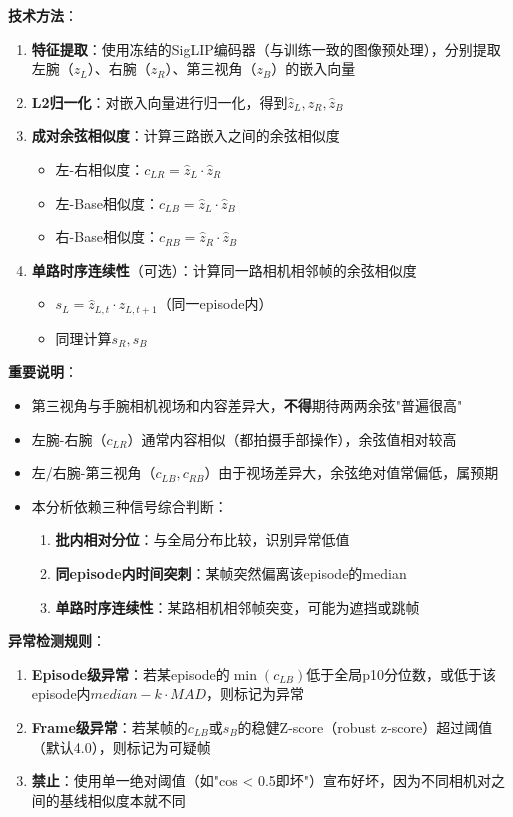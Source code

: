 \textbf{技术方法}：
\begin{enumerate}[leftmargin=2em]
    \item \textbf{特征提取}：使用冻结的SigLIP编码器（与训练一致的图像预处理），分别提取左腕（$z_L$）、右腕（$z_R$）、第三视角（$z_B$）的嵌入向量
    \item \textbf{L2归一化}：对嵌入向量进行归一化，得到$\hat{z}_L, \hat{z}_R, \hat{z}_B$
    \item \textbf{成对余弦相似度}：计算三路嵌入之间的余弦相似度
    \begin{itemize}
        \item 左-右相似度：$c_{LR} = \hat{z}_L \cdot \hat{z}_R$
        \item 左-Base相似度：$c_{LB} = \hat{z}_L \cdot \hat{z}_B$
        \item 右-Base相似度：$c_{RB} = \hat{z}_R \cdot \hat{z}_B$
    \end{itemize}
    \item \textbf{单路时序连续性}（可选）：计算同一路相机相邻帧的余弦相似度
    \begin{itemize}
        \item $s_L = \hat{z}_{L,t} \cdot \hat{z}_{L,t+1}$（同一episode内）
        \item 同理计算$s_R, s_B$
    \end{itemize}
\end{enumerate}

\textbf{重要说明}：
\begin{itemize}[leftmargin=2em]
    \item 第三视角与手腕相机视场和内容差异大，\textbf{不得}期待两两余弦"普遍很高"
    \item 左腕-右腕（$c_{LR}$）通常内容相似（都拍摄手部操作），余弦值相对较高
    \item 左/右腕-第三视角（$c_{LB}, c_{RB}$）由于视场差异大，余弦绝对值常偏低，属预期
    \item 本分析依赖三种信号综合判断：
    \begin{enumerate}
        \item \textbf{批内相对分位}：与全局分布比较，识别异常低值
        \item \textbf{同episode内时间突刺}：某帧突然偏离该episode的median
        \item \textbf{单路时序连续性}：某路相机相邻帧突变，可能为遮挡或跳帧
    \end{enumerate}
\end{itemize}

\textbf{异常检测规则}：
\begin{enumerate}[leftmargin=2em]
    \item \textbf{Episode级异常}：若某episode的$\min(c_{LB})$低于全局p10分位数，或低于该episode内$median - k \cdot MAD$，则标记为异常
    \item \textbf{Frame级异常}：若某帧的$c_{LB}$或$s_B$的稳健Z-score（robust z-score）超过阈值（默认4.0），则标记为可疑帧
    \item \textbf{禁止}：使用单一绝对阈值（如"cos < 0.5即坏"）宣布好坏，因为不同相机对之间的基线相似度本就不同
\end{enumerate}

